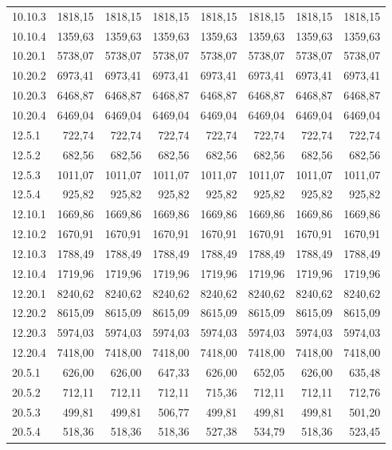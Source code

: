 \documentclass[../DoAn.tex]{subfiles}
\begin{document}
\begin{small}
\begin{longtable}{l|rrrrr|rr}
10.10.3 & 1818,15 & 1818,15 & 1818,15 & 1818,15 & 1818,15 & 1818,15 & 1818,15 \\
10.10.4 & 1359,63 & 1359,63 & 1359,63 & 1359,63 & 1359,63 & 1359,63 & 1359,63 \\
10.20.1 & 5738,07 & 5738,07 & 5738,07 & 5738,07 & 5738,07 & 5738,07 & 5738,07 \\
10.20.2 & 6973,41 & 6973,41 & 6973,41 & 6973,41 & 6973,41 & 6973,41 & 6973,41 \\
10.20.3 & 6468,87 & 6468,87 & 6468,87 & 6468,87 & 6468,87 & 6468,87 & 6468,87 \\
10.20.4 & 6469,04 & 6469,04 & 6469,04 & 6469,04 & 6469,04 & 6469,04 & 6469,04 \\
12.5.1 & 722,74 & 722,74 & 722,74 & 722,74 & 722,74 & 722,74 & 722,74 \\
12.5.2 & 682,56 & 682,56 & 682,56 & 682,56 & 682,56 & 682,56 & 682,56 \\
12.5.3 & 1011,07 & 1011,07 & 1011,07 & 1011,07 & 1011,07 & 1011,07 & 1011,07 \\
12.5.4 & 925,82 & 925,82 & 925,82 & 925,82 & 925,82 & 925,82 & 925,82 \\
12.10.1 & 1669,86 & 1669,86 & 1669,86 & 1669,86 & 1669,86 & 1669,86 & 1669,86 \\
12.10.2 & 1670,91 & 1670,91 & 1670,91 & 1670,91 & 1670,91 & 1670,91 & 1670,91 \\
12.10.3 & 1788,49 & 1788,49 & 1788,49 & 1788,49 & 1788,49 & 1788,49 & 1788,49 \\
12.10.4 & 1719,96 & 1719,96 & 1719,96 & 1719,96 & 1719,96 & 1719,96 & 1719,96 \\
12.20.1 & 8240,62 & 8240,62 & 8240,62 & 8240,62 & 8240,62 & 8240,62 & 8240,62 \\
12.20.2 & 8615,09 & 8615,09 & 8615,09 & 8615,09 & 8615,09 & 8615,09 & 8615,09 \\
12.20.3 & 5974,03 & 5974,03 & 5974,03 & 5974,03 & 5974,03 & 5974,03 & 5974,03 \\
12.20.4 & 7418,00 & 7418,00 & 7418,00 & 7418,00 & 7418,00 & 7418,00 & 7418,00 \\
20.5.1 & 626,00 & 626,00 & 647,33 & 626,00 & 652,05 & 626,00 & 635,48 \\
20.5.2 & 712,11 & 712,11 & 712,11 & 715,36 & 712,11 & 712,11 & 712,76 \\
20.5.3 & 499,81 & 499,81 & 506,77 & 499,81 & 499,81 & 499,81 & 501,20 \\
20.5.4 & 518,36 & 518,36 & 518,36 & 527,38 & 534,79 & 518,36 & 523,45 \\

\end{longtable}
\end{small}
\end{document}
